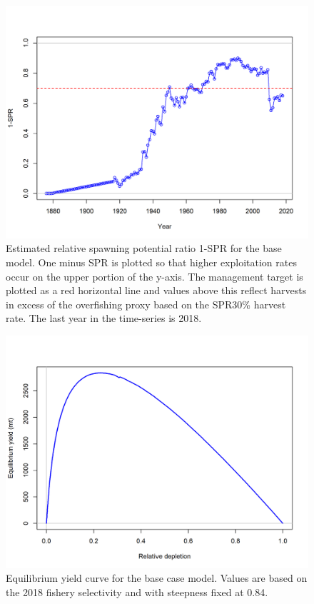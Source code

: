 \documentclass[12pt,]{article}
\begin{document}
\FloatBarrier  

\begin{figure}
\centering
\includegraphics{r4ss/plots_mod1/SPR2_minusSPRseries.png}
\caption{Estimated relative spawning potential ratio 1-SPR for the base
model. One minus SPR is plotted so that higher exploitation rates occur
on the upper portion of the y-axis. The management target is plotted as
a red horizontal line and values above this reflect harvests in excess
of the overfishing proxy based on the SPR30\% harvest rate. The last
year in the time-series is 2018. \label{fig:SPR_all_fig}}
\end{figure}

\FloatBarrier

\begin{figure}
\centering
\includegraphics{r4ss/plots_mod1/yield1_yield_curve.png}
\caption{Equilibrium yield curve for the base case model. Values are
based on the 2018 fishery selectivity and with steepness fixed at 0.84.
\label{fig:yield}}
\end{figure}
\end{document}

